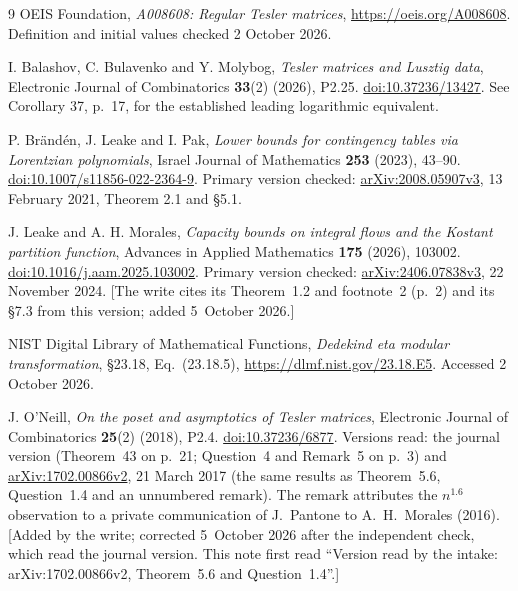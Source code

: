 \documentclass[11pt,a4paper]{article}
\theoremstyle{remark}\newtheorem{remark}[theorem]{Remark}
\numberwithin{equation}{section}
\begin{document}
\begin{thebibliography}{9}
OEIS Foundation, \emph{A008608: Regular Tesler matrices},
\url{https://oeis.org/A008608}. Definition and initial values checked 2 October 2026.

I. Balashov, C. Bulavenko and Y. Molybog,
\emph{Tesler matrices and Lusztig data},
Electronic Journal of Combinatorics \textbf{33}(2) (2026), P2.25.
\href{https://doi.org/10.37236/13427}{doi:10.37236/13427}.
See Corollary 37, p.\ 17, for the established leading logarithmic equivalent.

P. Br\"and\'en, J. Leake and I. Pak,
\emph{Lower bounds for contingency tables via Lorentzian polynomials},
Israel Journal of Mathematics \textbf{253} (2023), 43--90.
\href{https://doi.org/10.1007/s11856-022-2364-9}{doi:10.1007/s11856-022-2364-9}.
Primary version checked: \href{https://arxiv.org/abs/2008.05907v3}{arXiv:2008.05907v3}, 13 February 2021, Theorem 2.1 and \S5.1.

J. Leake and A. H. Morales,
\emph{Capacity bounds on integral flows and the Kostant partition function},
Advances in Applied Mathematics \textbf{175} (2026), 103002.
\href{https://doi.org/10.1016/j.aam.2025.103002}{doi:10.1016/j.aam.2025.103002}.
Primary version checked: \href{https://arxiv.org/abs/2406.07838v3}{arXiv:2406.07838v3}, 22 November 2024. [The write cites its Theorem~1.2 and footnote~2 (p.~2) and its \S7.3 from this version; added 5~October 2026.]

NIST Digital Library of Mathematical Functions,
\emph{Dedekind eta modular transformation}, \S23.18, Eq.\ (23.18.5),
\url{https://dlmf.nist.gov/23.18.E5}. Accessed 2 October 2026.

J. O'Neill,
\emph{On the poset and asymptotics of Tesler matrices},
Electronic Journal of Combinatorics \textbf{25}(2) (2018), P2.4.
\href{https://doi.org/10.37236/6877}{doi:10.37236/6877}.
Versions read: the journal version (Theorem~43 on p.~21; Question~4 and Remark~5 on p.~3) and \href{https://arxiv.org/abs/1702.00866v2}{arXiv:1702.00866v2}, 21 March 2017 (the same results as Theorem~5.6, Question~1.4 and an unnumbered remark). The remark attributes the $n^{1.6}$ observation to a private communication of J.~Pantone to A.~H.~Morales (2016). [Added by the write; corrected 5~October 2026 after the independent check, which read the journal version. This note first read ``Version read by the intake: arXiv:1702.00866v2, Theorem~5.6 and Question~1.4''.]


\end{thebibliography}
\end{document}
